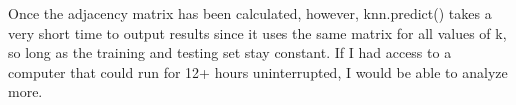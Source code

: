 \documentclass[]{article}
\begin{document}
		Once the adjacency matrix has been calculated, however, knn.predict() takes a very short time to output results since it uses the same matrix for all values of k, so long as the training and testing set stay constant. If I had access to a computer that could run for 12+ hours uninterrupted, I would be able to analyze more.
		
		
		
		
		
		
		
		
	
	
\end{document}
